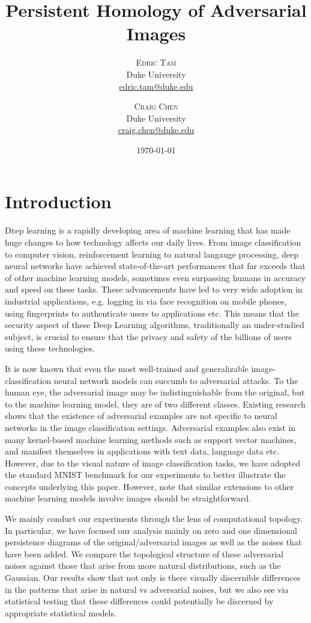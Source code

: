 \documentclass[twoside,twocolumn]{article}
\title{\LARGE Persistent Homology of Adversarial Images} %
\author{%
\textsc{Edric Tam}\\[1ex] %
\normalsize Duke University \\ %
\normalsize \href{mailto:edric.tam@duke.edu}{edric.tam@duke.edu} %
\and %
\textsc{Craig Chen}\\[1ex] %
\normalsize Duke University \\ %
\normalsize \href{mailto:craig.chen@duke.edu}{craig.chen@duke.edu} %
}
\date{\today} %
\begin{document}
\maketitle


\section{Introduction}

\lettrine[nindent=0em,lines=3]{D} eep learning is a rapidly developing area of machine learning that has made huge changes to how technology affects our daily lives. From image classification to computer vision, reinforcement learning to natural langauge processing, deep neural networks have achieved state-of-the-art performances that far exceeds that of other machine learning models, sometimes even surpassing humans in accuracy and speed on these tasks. These advancements have led to very wide adoption in industrial applications, e.g. logging in via face recognition on mobile phones, using fingerprints to authenticate users to applications etc. This means that the security aspect of these Deep Learning algorithms, traditionally an under-studied subject, is crucial to ensure that the privacy and safety of the billions of users using these technologies. 

It is now known that even the most well-trained and generalizable image-classification neural network models can succumb to adversarial attacks. To the human eye, the adversarial image may be indistinguishable from the original, but to the machine learning model, they are of two different classes. Existing research shows that the existence of adversarial examples are not specific to neural networks in the image classification settings. Adversarial examples also exist in many kernel-based machine learning methods such as support vector machines, and manifest themselves in applications with text data, language data etc. However, due to the visual nature of image classification tasks, we have adopted the standard MNIST benchmark for our experiments to better illustrate the concepts underlying this paper. However, note that similar extensions to other machine learning models involve images should be straightforward. 

We mainly conduct our experiments through the lens of computational topology. In particular, we have focused our analysis mainly on zero and one dimensional persistence diagrams of the original/adversarial images as well as the noises that have been added. We compare the topological structure of these adversarial noises against those that arise from more natural distributions, such as the Gaussian. Our results show that not only is there visually discernible differences in the patterns that arise in natural vs adversarial noises, but we also see via statistical testing that these differences could potentially be discerned by appropriate statistical models.
\end{document}
